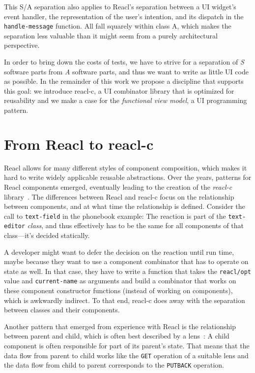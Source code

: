 \documentclass[sigplan,screen]{acmart}
\begin{document}
This S/A separation also applies to Reacl's separation between a UI
widget's event handler, the representation of the user's intention,
and its dispatch in the \texttt{handle-message} function.  All fall
squarely within class A, which makes the separation less valuable than
it might seem from a purely architectural perspective.

In order to bring down the costs of tests, we have to strive for
a separation of \textit{S} software parts from
\textit{A} software parts, and thus we want to write as little
UI code as possible. In the remainder of this work we propose a
discipline that supports this goal: we introduce reacl-c, a UI
combinator library that is optimized for reusability and we make a
case for the \textit{functional view model}, a UI programming
pattern.

\section{From Reacl to reacl-c}
\label{sec:reacl-c}

Reacl allows for many different styles of component
composition, which makes it hard to write widely applicable reusable
abstractions. Over the years, patterns for
Reacl components emerged, eventually leading to the creation of the \textit{reacl-c}
library~\cite{reacl-c}.
The differences between Reacl and reacl-c focus on the relationship
between components, and at what time the relationship is
defined.  Consider the call to \texttt{text-field} in the
phonebook example:
The reaction is part of the \texttt{text-editor} \emph{class}, and
thus effectively has to be the same for all components of that
class---it's decided statically.

A developer might want to defer the decision on the reaction until run time,
maybe because they want to use a
component combinator that has to operate on state as well.
In that case, they have
to write a function that takes the \texttt{reacl/opt} value and
\texttt{current-name} as arguments and build a combinator
that works on these component constructor functions (instead of
working on components), which is awkwardly indirect.
To that end, reacl-c does away with the
separation between classes and their components.

Another pattern that emerged from experience with Reacl
is the relationship between parent
and child, which is often best described by a lens~\cite{Lenses}:
A child component is often responsible for part of its parent's
state. That means that the data flow from parent to child works like
the \texttt{GET} operation of a suitable lens and the data flow from
child to parent corresponds to the \texttt{PUTBACK} operation.
\end{document}
